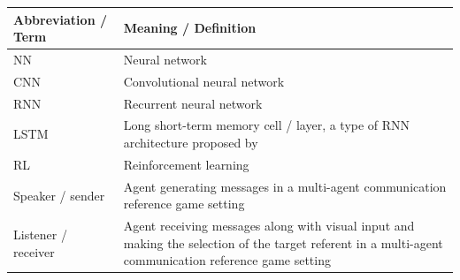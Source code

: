 
\begin{table}[]
	\centering
	\begin{tabularx}{\textwidth}{|X|X|}
		\hline
		\textbf{Abbreviation / Term} & \textbf{Meaning / Definition}                                                                                                                          \\ \hline
		NN                           & Neural network                                                                                                                                         \\ \hline
		CNN                          & Convolutional neural network                                                                                                                           \\ \hline
		RNN                          & Recurrent neural network                                                                                                                               \\ \hline
		LSTM                         & Long short-term memory cell / layer, a type of RNN architecture proposed by \cite{hochreiter1997long}                                                                                                                         \\ \hline
		RL                           & Reinforcement learning                                                                                                                                 \\ \hline
		Speaker / sender             & Agent generating messages in a multi-agent communication reference game setting                                                                        \\ \hline
		Listener / receiver          & Agent receiving messages along with visual input and making the selection of the target referent \newline in a multi-agent communication reference game setting \\ \hline

\end{tabularx}
\end{table}
